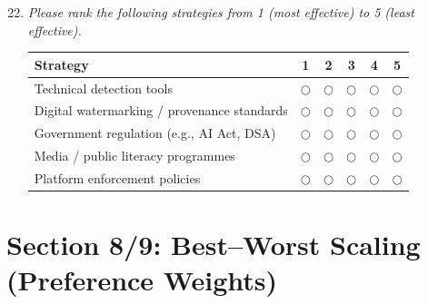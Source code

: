 \begin{enumerate}[label=\textbf{Q\arabic*.}, leftmargin=3em]
\setcounter{enumi}{21}

    \item \textit{Please rank the following strategies from 1 (most effective) to 5 (least effective).}

    \medskip
    \noindent\begin{tabular}{l ccccc}
    \toprule
    \textbf{Strategy} & \textbf{1} & \textbf{2} & \textbf{3} & \textbf{4} & \textbf{5} \\
    \midrule
    Technical detection tools                    & $\bigcirc$ & $\bigcirc$ & $\bigcirc$ & $\bigcirc$ & $\bigcirc$ \\
    Digital watermarking / provenance standards  & $\bigcirc$ & $\bigcirc$ & $\bigcirc$ & $\bigcirc$ & $\bigcirc$ \\
    Government regulation (e.g., AI Act, DSA)    & $\bigcirc$ & $\bigcirc$ & $\bigcirc$ & $\bigcirc$ & $\bigcirc$ \\
    Media / public literacy programmes           & $\bigcirc$ & $\bigcirc$ & $\bigcirc$ & $\bigcirc$ & $\bigcirc$ \\
    Platform enforcement policies                & $\bigcirc$ & $\bigcirc$ & $\bigcirc$ & $\bigcirc$ & $\bigcirc$ \\
    \bottomrule
    \end{tabular}

\end{enumerate}

\section*{Section 8/9: Best--Worst Scaling (Preference Weights)}

